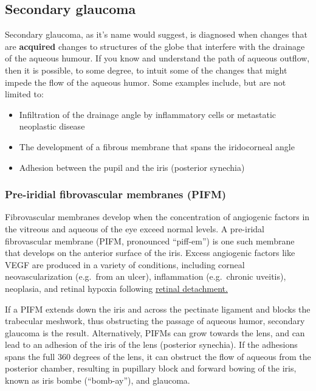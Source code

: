 \documentclass[openany]{book}
\providecommand{\tightlist}{%
  \setlength{\itemsep}{0pt}\setlength{\parskip}{0pt}}
\begin{document}
\subsection{Secondary glaucoma}\label{secondary-glaucoma}

Secondary glaucoma, as it's name would suggest, is diagnosed when
changes that are \textbf{acquired} changes to structures of the globe
that interfere with the drainage of the aqueous humour. If you know and
understand the path of aqueous outflow, then it is possible, to some
degree, to intuit some of the changes that might impede the flow of the
aqueous humor. Some examples include, but are not limited to:

\begin{itemize}
\tightlist
\item
  Infiltration of the drainage angle by inflammatory cells or metastatic
  neoplastic disease
\item
  The development of a fibrous membrane that spans the iridocorneal
  angle
\item
  Adhesion between the pupil and the iris (posterior synechia)
\end{itemize}

\hypertarget{pre-iridial-fibrovascular-membranes-pifm}{\subsubsection{Pre-iridial
fibrovascular membranes
(PIFM)}\label{pre-iridial-fibrovascular-membranes-pifm}}

Fibrovascular membranes develop when the concentration of angiogenic
factors in the vitreous and aqueous of the eye exceed normal levels. A
pre-iridal fibrovascular membrane (PIFM, pronounced ``piff-em'') is one
such membrane that develops on the anterior surface of the iris. Excess
angiogenic factors like VEGF are produced in a variety of conditions,
including corneal neovascularization (e.g.~from an ulcer), inflammation
(e.g.~chronic uveitis), neoplasia, and retinal hypoxia following
\protect\hyperlink{retinal-detachment}{retinal detachment.}

If a PIFM extends down the iris and across the pectinate ligament and
blocks the trabecular meshwork, thus obstructing the passage of aqueous
humor, secondary glaucoma is the result. Alternatively, PIFMs can grow
towards the lens, and can lead to an adhesion of the iris of the lens
(posterior synechia). If the adhesions spans the full 360 degrees of the
lens, it can obstruct the flow of aqueous from the posterior chamber,
resulting in pupillary block and forward bowing of the iris, known as
iris bombe (``bomb-ay''), and glaucoma.
\end{document}
